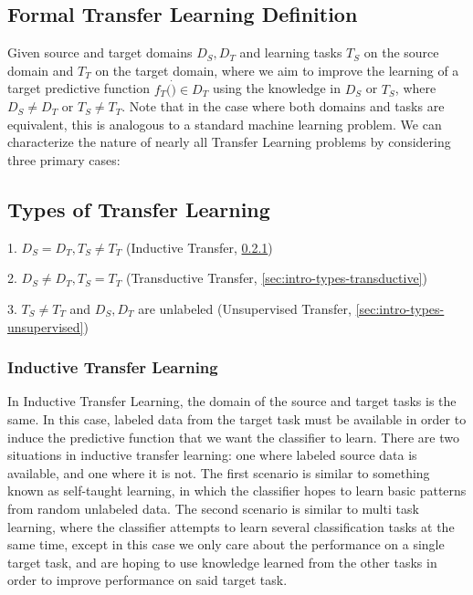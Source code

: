 \documentclass[10pt,twocolumn,letterpaper]{article}
\begin{document}
   \subsection{Formal Transfer Learning Definition} \label{sec:intro-def}
      Given source and target domains $D_S, D_T$ and learning tasks $T_S$ on the source domain and $T_T$ on the target
      domain, where we aim to improve the learning of a target predictive function $f_T(\dot)\in D_T$ using
      the knowledge in $D_S$ or $T_S$, where $D_S\neq D_T$ or $T_S\neq T_T$. Note that in the case where both domains
      and tasks are equivalent, this is analogous to a standard machine learning problem. We can characterize the
      nature of nearly all Transfer Learning problems by considering three primary cases:

   \subsection{Types of Transfer Learning} \label{sec:intro-types}
      1. $D_S = D_T, T_S\neq T_T$ (Inductive Transfer, \ref{sec:intro-types-inductive})

      2. $D_S\neq D_T, T_S = T_T$ (Transductive Transfer, \ref{sec:intro-types-transductive})

      3. $T_S\neq T_T$ and $D_S, D_T$ are unlabeled (Unsupervised Transfer, \ref{sec:intro-types-unsupervised})

      \subsubsection{Inductive Transfer Learning} \label{sec:intro-types-inductive}

         In Inductive Transfer Learning, the domain of the source and target tasks is the same. In this case, labeled data
         from the target task must be available in order to induce the predictive function that we want the classifier to learn.
         There are two situations in inductive transfer learning: one where labeled source data is available, and one where it
         is not. The first scenario is similar to something known as self-taught learning, in which the classifier hopes to
         learn basic patterns from random unlabeled data. The second scenario is similar to multi task learning, where the
         classifier attempts to learn several classification tasks at the same time, except in this case we only care about
         the performance on a single target task, and are hoping to use knowledge learned from the other tasks in order to
         improve performance on said target task.
\end{document}
